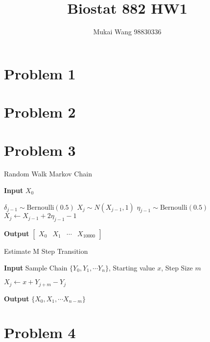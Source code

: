 \documentclass[12pt]{article}
\title{Biostat 882 HW1}
\date{}
\author{Mukai Wang 98830336}
\begin{document}
\maketitle


\section*{Problem 1}



\section*{Problem 2}


\section*{Problem 3}

\begin{algorithm}
	\caption{Random Walk Markov Chain}\label{RWMC}
	\hspace*{\algorithmicindent} \textbf{Input} $X_0$
	\begin{algorithmic}[1]
		\State $\delta_{j-1} \sim \text{Bernoulli}(0.5)$
			\State $X_j \sim N(X_{j-1}, 1)$
		\Else
			\State $\eta_{j-1} \sim \text{Bernoulli}(0.5)$
			\State $X_j \gets X_{j-1} + 2\eta_{j-1} - 1$
		\EndIf
		\EndFor
	\end{algorithmic}
	\hspace*{\algorithmicindent} \textbf{Output} $\begin{bmatrix}X_0 & X_1 & \cdots &X_{10000} \end{bmatrix}$
\end{algorithm}

\begin{algorithm}
	\caption{Estimate M Step Transition}\label{mstepest}
	\hspace*{\algorithmicindent} \textbf{Input} Sample Chain $\{Y_0, Y_1, \cdots Y_n \}$, Starting value $x$, Step Size $m$
	\begin{algorithmic}[1]
		\State $X_j \gets x + Y_{j+m} - Y_{j}$
		\EndFor
	\end{algorithmic}
	\hspace*{\algorithmicindent} \textbf{Output} $\{X_0, X_1, \cdots X_{n-m} \}$
\end{algorithm}

\section*{Problem 4}
\end{document}
